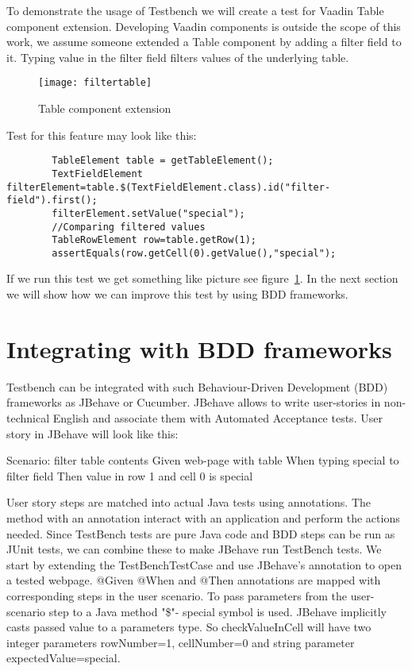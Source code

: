To demonstrate the usage of Testbench we will create a test for Vaadin Table
component extension. Developing Vaadin components is outside the scope of this
work, we assume someone extended a Table component by adding a filter field to
it. Typing value in the filter field filters values of the underlying table. 
	\begin{figure}
	\label{fig:filtertable}
	\texttt{[image: filtertable]}
	\caption{Table component extension}
	\end{figure}

Test for this feature may look like this:
  	\lstset{language=Java}
  	\begin{lstlisting}
		TableElement table = getTableElement();
		TextFieldElement filterElement=table.$(TextFieldElement.class).id("filter-field").first();
		filterElement.setValue("special");
		//Comparing filtered values
		TableRowElement row=table.getRow(1);
		assertEquals(row.getCell(0).getValue(),"special");
	\end{lstlisting}	
	
If we run this test we get something like picture see
figure~\ref{fig:filtertable}. In the next section we will show how we can improve this test by using BDD frameworks.

\section{Integrating with BDD frameworks}

Testbench can be integrated with such Behaviour-Driven Development (BDD)
frameworks as JBehave or Cucumber.
JBehave allows to write user-stories in non-technical English and associate them with Automated Acceptance tests. 
User story in JBehave will look like this:

Scenario: filter table contents
Given web-page with table
When typing special to filter field
Then value in row 1 and cell 0 is special

User story steps are matched into actual Java tests using annotations. 
 The method with an annotation interact with an application and perform the actions needed.
  Since TestBench tests are pure Java code and BDD steps can be run as JUnit tests, we can combine these to make
   JBehave run TestBench tests. We start by extending the TestBenchTestCase  and use JBehave's \@BeforeScenario
   annotation to open a tested webpage.
   @Given @When and @Then annotations are mapped with corresponding steps in the user scenario.
   To pass parameters from the user-scenario step to a Java method "\$"- special symbol is used.
    JBehave implicitly casts passed value to a parameters type.
    So checkValueInCell will have two integer parameters rowNumber=1, cellNumber=0 and string parameter expectedValue=special. 

